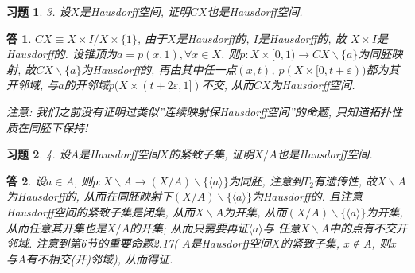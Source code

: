 \documentclass{ctexart}%
\newtheorem*{exercise}{习题}
\newtheorem*{solution}{答}
\theoremstyle{definition}
\theoremstyle{remark}
\begin{document}
\begin{exercise}3. 设$X$是Hausdorff空间, 证明$CX$也是Hausdorff空间.
\end{exercise}
\begin{solution}$CX\equiv X\times I\slash X\times \{1\}$, 由于$X$是Hausdorff的, $I$是Hausdorff的, 故
$X\times I$是Hausdorff的. 设锥顶为$a= p(x,1), \forall x\in X$. 则$p: X\times [0,1)\rightarrow CX\backslash \{a\}$为同胚映射, 故$CX\backslash \{a\}$为Hausdorff的, 再由其中任一点$(x,t)$, $p(X\times[0,t+\varepsilon))$都为其开邻域, 与$a$的开邻域$p(X\times (t+2\varepsilon,1])$不交, 从而$CX$为Hausdorff空间. 

注意: 我们之前没有证明过类似''连续映射保Hausdorff空间''的命题, 只知道拓扑性质在同胚下保持! 
\end{solution}

\begin{exercise}4. 设$A$是Hausdorff空间$X$的紧致子集, 证明$X\slash A$也是Hausdorff空间. 
\end{exercise}
\begin{solution}
设$a\in A$, 则$p: X\backslash A\rightarrow (X\slash A)\backslash \{\langle a\rangle\}$为同胚, 注意到$T_2$有遗传性, 故$X\backslash A$为Hausdorff的, 从而在同胚映射下$(X\slash A)\backslash \{\langle a\rangle\}$为Hausdorff的. 且注意Hausdorff空间的紧致子集是闭集, 从而$X\backslash A$为开集, 从而$(X\slash A)\backslash \{\langle a\rangle \}$为开集, 从而任意其开集也是$X\slash A$的开集; 从而只需要再证$\langle a\rangle$与 任意$X\backslash A$中的点有不交开邻域. 注意到第6节的重要命题2.17( $A$是Hausdorff空间$X$的紧致子集, $x\notin A$, 则$x$与$A$有不相交(开)邻域), 从而得证. 
\end{solution}
\end{document}
